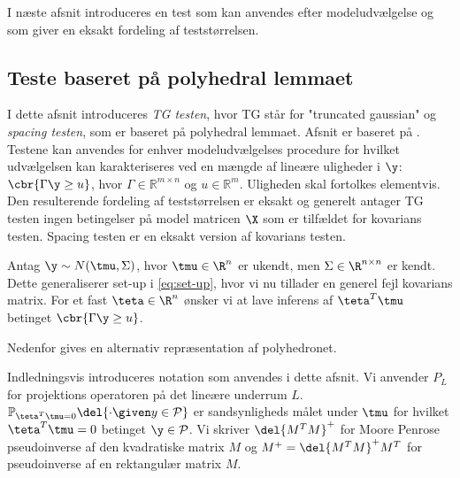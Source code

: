 I næste afsnit introduceres en test som kan anvendes efter modeludvælgelse og som giver en eksakt fordeling af teststørrelsen.

\newpage
\subsection{Teste baseret på polyhedral lemmaet}
I dette afsnit introduceres \textit{TG testen}, hvor TG står for "truncated gaussian" og \textit{spacing testen}, som er baseret på polyhedral lemmaet. 
Afsnit er baseret på \citep{post_inference}.
Testene kan anvendes for enhver modeludvælgelses procedure for hvilket udvælgelsen kan karakteriseres ved en mængde af lineære uligheder i \(\y\): \(\cbr{\Gamma \y \geq u}\), hvor \(\Gamma \in \mathbb{R}^{m \times n}\) og \(u \in \mathbb{R}^m\). Uligheden skal fortolkes elementvis.
Den resulterende fordeling af teststørrelsen er eksakt og generelt antager TG testen ingen betingelser på model matricen \(\X\) som er tilfældet for kovarians testen.
Spacing testen er en eksakt version af kovarians testen. 

Antag \(\y \sim N(\tmu, \Sigma)\), hvor \(\tmu \in \R^{n}\) er ukendt, men \(\Sigma \in \R^{n \times n}\) er kendt.
Dette generaliserer set-up i \eqref{eq:set-up}, hvor vi nu tillader en generel fejl kovarians matrix.
For et fast \(\teta \in \R^n\) ønsker vi at lave inferens af \(\teta^T \tmu\) betinget \(\cbr{\Gamma \y \geq u}\).

Nedenfor gives en alternativ repræsentation af polyhedronet.


Indledningsvis introduceres notation som anvendes i dette afsnit.
Vi anvender \(P_L\) for projektions operatoren på det lineære underrum \(L\).
\(\mathbb{P}_{\teta^T \tmu = 0} \del{\cdot \given y \in \mathcal{P}} \) er sandsynligheds målet under \(\tmu\) for hvilket \(\teta^T \tmu =0 \) betinget \(\y \in \mathcal{P}\).
Vi skriver \(\del{M^T M}^+\) for Moore Penrose pseudoinverse af den kvadratiske matrix \(M\) og \(M^+ = \del{M^T M}^+ M^T\) for pseudoinverse af en rektangulær matrix \(M\). 


